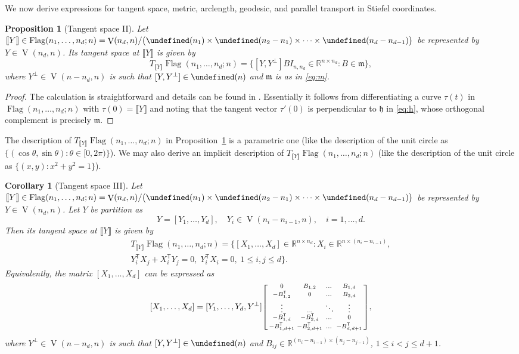 \documentclass[11pt,reqno]{amsart}%
\newtheorem{proposition}[theorem]{Proposition}
\newtheorem{corollary}[theorem]{Corollary}
\theoremstyle{definition}
\theoremstyle{remark}
\newcommand{\tp}{{\scriptscriptstyle\mathsf{T}}}
\newcommand{\lb}{\llbracket}
\newcommand{\rb}{\rrbracket}
\let\O\undefined
\DeclareMathOperator{\V}{V}
\DeclareMathOperator{\Flag}{Flag}
\DeclareMathOperator{\O}{O}
\begin{document}
We now derive expressions for tangent space, metric, arclength, geodesic, and parallel transport in  Stiefel coordinates.
\begin{proposition}[Tangent space II]\label{prop:tangent2a}
Let $\lb Y \rb\in \Flag(n_1,\dots, n_d;n) = \V(n_d,n) / \bigl(\O(n_1) \times \O(n_2-n_1) \times \dots \times \O(n_d- n_{d-1})\bigr)$ be represented by $Y\in \V(n_d, n)$. Its tangent space at $\lb Y \rb$  is given by
\[
T_{\lb Y \rb}\Flag(n_1,\dots,n_d;n) = \lbrace  [Y,Y^{\perp}] B I_{n,n_d} \in \mathbb{R}^{n \times n_d}: B\in \mathfrak{m}\rbrace,
\]
where $Y^{\perp} \in \V(n-n_d,n) $ is such that $[Y,Y^{\perp}] \in \O(n)$ and $\mathfrak{m}$ is as in \eqref{eq:m}.
\end{proposition}
\begin{proof}
The  calculation is straightforward and details can be found in \cite{NSP2006}. Essentially it follows from differentiating a curve $\tau(t)$ in $\Flag(n_1,\dots,n_d;n)$ with $\tau(0) = \lb Y \rb$ and noting that the tangent vector $\tau'(0)$ is perpendicular to $\mathfrak{h}$ in \eqref{eq:h}, whose orthogonal complement is precisely $\mathfrak{m}$.
\end{proof}
The description of $T_{\lb Y \rb}\Flag(n_1,\dots,n_d;n) $ in Proposition~\ref{prop:tangent2a} is a parametric one (like the description of the unit circle as $\{(\cos \theta, \sin \theta) : \theta \in [0,2\pi)\}$). We may also derive an  implicit description of $T_{\lb Y \rb}\Flag(n_1,\dots,n_d;n) $  (like the description of the unit circle as $\{(x,y) : x^2 + y^2 = 1\}$).
\begin{corollary}[Tangent space III]\label{prop:tangent2b}
Let $\lb Y \rb\in \Flag(n_1,\dots, n_d;n) = \V(n_d,n) / \bigl(\O(n_1) \times \O(n_2-n_1) \times \dots \times \O(n_d- n_{d-1})\bigr)$ be represented by $Y\in \V(n_d, n)$. 
Let $Y$ be partition as
\[
Y = [Y_1,\dots, Y_d], \quad Y_i \in \V(n_i - n_{i-1},n), \quad i=1,\dots, d.
\]
Then its tangent space  at $\lb Y \rb$  is given by
\begin{multline}\label{eq:tangent space}
T_{\lb Y \rb}\Flag(n_1,\dots,n_d;n) = \lbrace  [X_1,\dots,X_d]\in \mathbb{R}^{n\times n_d} : X_i\in \mathbb{R}^{n \times (n_i - n_{i-1})}, \\
Y_i^\tp  X_j + X_i^\tp  Y_j = 0,\; Y_i^\tp  X_i = 0,\; 1\le i, j \le d  \rbrace.
\end{multline}
Equivalently, the matrix $[X_1,\dots, X_d]$ can be  expressed as
\[
[X_1,\dots, X_d] = [Y_1,\dots,Y_d,Y^\perp] \begin{bsmallmatrix}
0 & B_{1,2} & \dots & B_{1,d} \\
-B_{1,2}^\tp  & 0 & \dots & B_{2,d} \\
\vdots & \dots & \ddots & \vdots \\
-B_{1,d}^\tp  & -B_{2,d}^\tp  & \dots & 0  \\
-B_{1,d+1}^\tp  & -B_{2,d+1}^\tp  & \dots & -B_{d,d+1}^\tp   
\end{bsmallmatrix},
\]
where $Y^{\perp} \in \V(n-n_d,n) $ is such that $[Y,Y^{\perp}] \in \O(n)$ and $B_{ij}\in \mathbb{R}^{(n_i-n_{i-1})\times (n_j-n_{j-1})}$, $1\le i<j\le d+1$.
\end{corollary}
\end{document}
